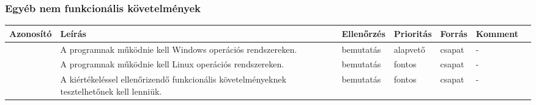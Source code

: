 \subsubsection{Egyéb nem funkcionális követelmények}

\noindent\begin{tabularx}{\textwidth}{| l | X | l | l | l | l | l |}
	\hline
	\textbf{Azonosító}                                                                        &
	\textbf{Leírás}                                                                           &
	\textbf{Ellenőrzés}                                                                       &
	\textbf{Prioritás}                                                                        &
	\textbf{Forrás}                                                                           &
	\textbf{Komment}                                                                            \\

	\hline
	\hline


	\azonosito                                                                                &
	A programnak működnie kell Windows operációs rendszereken.                                &
	bemutatás                                                                                 &
	alapvető                                                                                  &
	csapat                                                                                    &
	-                                                                                           \\
	\hline


	\azonosito                                                                                &
	A programnak működnie kell Linux operációs rendszereken.                                  &
	bemutatás                                                                                 &
	fontos                                                                                    &
	csapat                                                                                    &
	-                                                                                           \\
	\hline


	\azonosito                                                                                &
	A kiértékeléssel ellenőrizendő funkcionális követelményeknek tesztelhetőnek kell lenniük. &
	bemutatás                                                                                 &
	fontos                                                                                    &
	csapat                                                                                    &
	-                                                                                           \\
	\hline



\end{tabularx}
